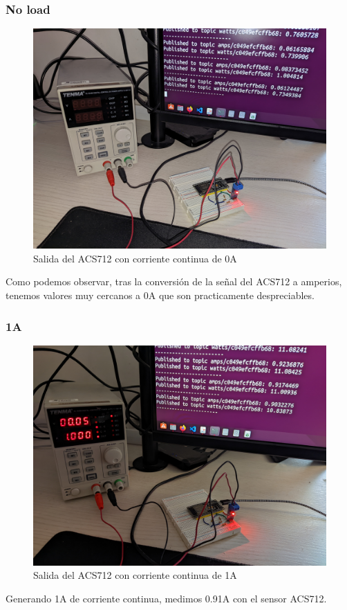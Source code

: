 \begin{titlepage}
\subsubsection{No load}
\begin{figure}[h!]
	\centering
	\includegraphics[width=1\textwidth]{imagenes/DC_noload.jpg}
	\caption{Salida del ACS712 con corriente continua de 0A}
\end{figure}
Como podemos observar, tras la conversión de la señal del ACS712 a amperios, tenemos valores muy cercanos a 0A que son practicamente despreciables. \\
\subsubsection{1A}
\begin{figure}[h!]
	\centering
	\includegraphics[width=1\textwidth]{imagenes/DC_1Amp.jpg}
	\caption{Salida del ACS712 con corriente continua de 1A}
\end{figure}
Generando 1A de corriente continua, medimos 0.91A con el sensor ACS712. \\

\end{titlepage}
